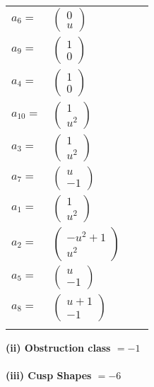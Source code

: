 \documentclass[1p]{elsarticle_modified}
\theoremstyle{definition}
\begin{document}
\begin{tabular}{m{7pt} m{180pt} m{7pt} m{180pt} }
\flushright $a_{6}=$&$\begin{pmatrix}0\\u\end{pmatrix}$ \\
\flushright $a_{9}=$&$\begin{pmatrix}1\\0\end{pmatrix}$ \\
\flushright $a_{4}=$&$\begin{pmatrix}1\\0\end{pmatrix}$ \\
\flushright $a_{10}=$&$\begin{pmatrix}1\\u^2\end{pmatrix}$ \\
\flushright $a_{3}=$&$\begin{pmatrix}1\\u^2\end{pmatrix}$ \\
\flushright $a_{7}=$&$\begin{pmatrix}u\\-1\end{pmatrix}$ \\
\flushright $a_{1}=$&$\begin{pmatrix}1\\u^2\end{pmatrix}$ \\
\flushright $a_{2}=$&$\begin{pmatrix}- u^2+1\\u^2\end{pmatrix}$ \\
\flushright $a_{5}=$&$\begin{pmatrix}u\\-1\end{pmatrix}$ \\
\flushright $a_{8}=$&$\begin{pmatrix}u+1\\-1\end{pmatrix}$\\&\end{tabular}
\flushleft \textbf{(ii) Obstruction class $= -1$}\\~\\
\flushleft \textbf{(iii) Cusp Shapes $= -6$}\\~\\
\end{document}
